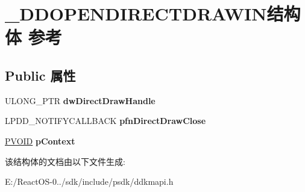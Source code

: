 \hypertarget{struct___d_d_o_p_e_n_d_i_r_e_c_t_d_r_a_w_i_n}{}\section{\+\_\+\+D\+D\+O\+P\+E\+N\+D\+I\+R\+E\+C\+T\+D\+R\+A\+W\+I\+N结构体 参考}
\label{struct___d_d_o_p_e_n_d_i_r_e_c_t_d_r_a_w_i_n}
\subsection*{Public 属性}
\begin{DoxyCompactItemize}
\item 
\mbox{\label{struct___d_d_o_p_e_n_d_i_r_e_c_t_d_r_a_w_i_n_a0cb1f0dcf40e7fc7b31f05b55e6198da}} 
U\+L\+O\+N\+G\+\_\+\+P\+TR {\bfseries dw\+Direct\+Draw\+Handle}
\item 
\mbox{\label{struct___d_d_o_p_e_n_d_i_r_e_c_t_d_r_a_w_i_n_a689633f5136860701edbe4625315853e}} 
L\+P\+D\+D\+\_\+\+N\+O\+T\+I\+F\+Y\+C\+A\+L\+L\+B\+A\+CK {\bfseries pfn\+Direct\+Draw\+Close}
\item 
\mbox{\label{struct___d_d_o_p_e_n_d_i_r_e_c_t_d_r_a_w_i_n_af03d69a8c8015b7a0295429072fe5137}} 
\hyperlink{interfacevoid}{P\+V\+O\+ID} {\bfseries p\+Context}
\end{DoxyCompactItemize}


该结构体的文档由以下文件生成\+:\begin{DoxyCompactItemize}
\item 
E\+:/\+React\+O\+S-\/0../sdk/include/psdk/ddkmapi.\+h\end{DoxyCompactItemize}
